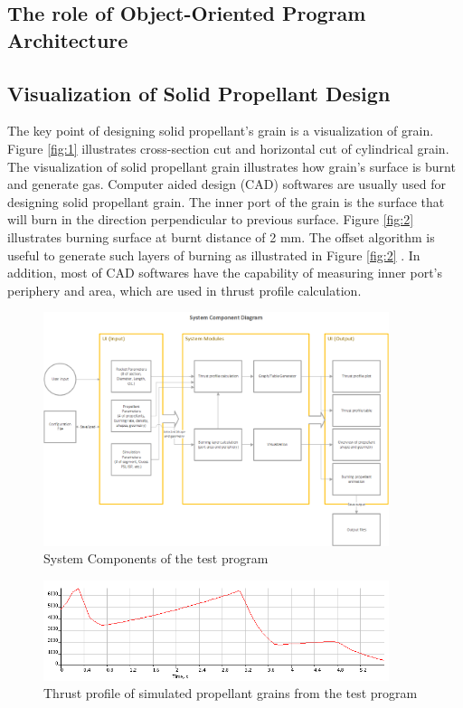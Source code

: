 \documentclass[conference]{IEEEtran}
\begin{document}
\subsection{The role of Object-Oriented Program Architecture}

\subsection{Visualization of Solid Propellant Design}
The key point of designing solid propellant’s grain is a visualization of grain. Figure {\ref{fig:1}} illustrates cross-section cut and horizontal cut of cylindrical grain. The visualization of solid propellant grain illustrates how grain's surface is burnt and generate gas. Computer aided design (CAD) softwares are usually used for designing solid propellant grain. The inner port of the grain is the surface that will burn in the direction perpendicular to previous surface. Figure {\ref{fig:2}} illustrates burning surface at burnt distance of 2 mm. The offset algorithm is useful to generate such layers of burning as illustrated in Figure {\ref{fig:2}} {\cite{offset}}. In addition, most of CAD softwares have the capability of measuring inner port's periphery and area, which are used in thrust profile calculation.   




\begin{figure}[t]
\centering
\includegraphics[width=0.9\textwidth]{SystemComponents}
\caption{System Components of the test program}
\label{fig:3}
\end{figure}
\begin{figure}[t]
\centering
\includegraphics[width=0.9\textwidth]{thrust}
\caption{Thrust profile of simulated propellant grains from the test program}
\label{fig:5}
\end{figure}
\end{document}
